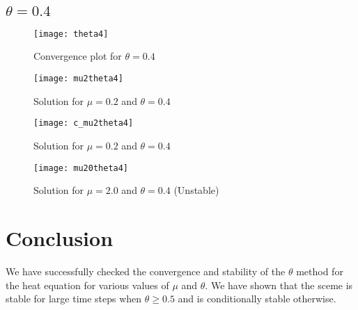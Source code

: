 \documentclass{article}
\begin{document}
\clearpage
\subsection{$\theta = 0.4$}
\begin{figure}[h!]
    \centering
    \texttt{[image: theta4]}
    \caption{Convergence plot for $\theta=0.4$}
\end{figure}

\begin{figure}[h!]
    \centering
    \texttt{[image: mu2theta4]}
    \caption{Solution for $\mu=0.2$ and $\theta=0.4$}
\end{figure}
\begin{figure}[h!]
    \centering
    \texttt{[image: c\_mu2theta4]}
    \caption{Solution for $\mu=0.2$ and $\theta=0.4$}
\end{figure}
\begin{figure}[h!]
    \centering
    \texttt{[image: mu20theta4]}
    \caption{Solution for $\mu=2.0$ and $\theta=0.4$ (Unstable)}
\end{figure}

\section{Conclusion}
We have successfully checked the convergence and stability of the $\theta$ method for the heat equation for various values of $\mu$ and $\theta$. We have shown that the sceme is stable for large time steps when $\theta \geq 0.5$ and is conditionally stable otherwise.
\end{document}
